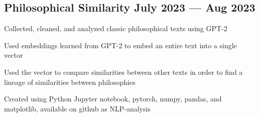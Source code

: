 \subsection{{Philosophical Similarity \hfill July 2023 --- Aug 2023}}
\begin{zitemize}
\begin{zitemize}
\item Collected, cleaned, and analyzed classic philosophical texts using GPT-2 
\item Used embeddings learned from GPT-2 to embed an entire text into a single vector
\item Used the vector to compare similarities between other texts in order to find a lineage of similarities between philosophies
\item Created using Python Jupyter notebook, pytorch, numpy, pandas, and matplotlib, available on github as NLP-analysis
\end{zitemize}
\end{zitemize}






